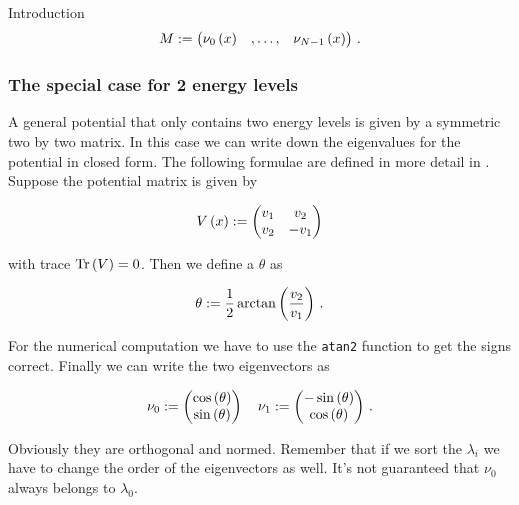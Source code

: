 \begin{chapter}{Introduction}
\begin{equation} \label{eq:general_transformation_matirx}
  M :=
  \begin{pmatrix}
    \nu_0\left( x \right) & , \hdots , & \nu_{N-1}\left( x \right)
  \end{pmatrix} \,.
\end{equation}

\subsubsection{The special case for 2 energy levels}

A general potential that only contains two energy levels is given by a symmetric
two by two matrix. In this case we can write down the eigenvalues for the potential
in closed form. The following formulae are defined in more detail in \cite{H_T_semiclassical_2x2}.
Suppose the potential matrix is given by

\begin{equation}
  V\left( x \right) :=
  \begin{pmatrix}
    v_1 &  v_2 \\
    v_2 & -v_1
  \end{pmatrix}
\end{equation}

with trace $\text{Tr}\left( V \right) = 0$. Then we define a $\theta$ as

\begin{equation}
  \theta := \frac{1}{2} \arctan \left( \frac{v_2}{v_1} \right) \,.
\end{equation}

For the numerical computation we have to use the \texttt{atan2} function to get the signs
correct. Finally we can write the two eigenvectors as

\begin{equation}
  \nu_0 :=
  \begin{pmatrix}
    \cos\left( \theta \right) \\
    \sin\left( \theta \right)
  \end{pmatrix}
  \quad
  \nu_1 :=
  \begin{pmatrix}
    -\sin\left( \theta \right) \\
    \cos\left( \theta \right)
  \end{pmatrix} \,.
\end{equation}

Obviously they are orthogonal and normed. Remember that if we sort the $\lambda_i$
we have to change the order of the eigenvectors
as well. It's not guaranteed that $\nu_0$ always belongs to $\lambda_0$.


\end{chapter}
